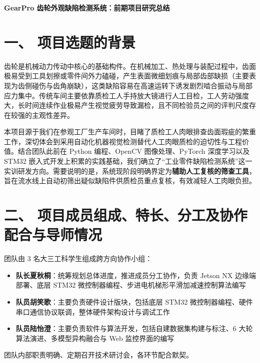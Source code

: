 
\begin{center}
{\bfseries GearPro 齿轮外观缺陷检测系统：前期项目研究总结\par}
\end{center}

\section*{一、 项目选题的背景}

齿轮是机械动力传动中核心的基础构件。在机械加工、热处理与装配过程中，齿面极易受到工具划擦或零件间外力磕碰，产生表面微细划痕与局部齿部缺损（主要表现为齿侧碰伤与齿角崩缺），这类缺陷容易在高速运转下诱发剧烈啮合振动与局部应力集中。传统车间主要依靠质检工人手持放大镜进行人工目检，工人劳动强度大，长时间连续作业极易产生视觉疲劳导致漏检，且不同检验员之间的评判尺度存在较强的主观性差异。

本项目源于我们在参观工厂生产车间时，目睹了质检工人肉眼排查齿面瑕疵的繁重工作，深切体会到采用自动化机器视觉检测替代人工肉眼质检的迫切性与工程价值。结合团队此前在 Python 编程、OpenCV 图像处理、PyTorch 深度学习以及 STM32 嵌入式开发上积累的实践基础，我们确立了“工业零件缺陷检测系统”这一实训研发方向。需要说明的是，系统现阶段明确界定为\textbf{辅助人工复核的筛查工具}，旨在流水线上自动初筛出疑似缺陷件供质检员重点复核，有效减轻人工肉眼负担。

\section*{二、 项目成员组成、特长、分工及协作配合与导师情况}

团队由 3 名大三工科学生组成跨方向协作小组：
\begin{itemize}
    \item \textbf{队长夏秋桐}：统筹规划总体进度，推进成员分工协作，负责 Jetson NX 边缘端部署、底层 STM32 微控制器编程、步进电机梯形平滑加减速控制算法编写
    \item \textbf{队员胡笑歌}：主要负责硬件设计版块，包括底层 STM32 微控制器编程、硬件串口通信协议联调，整体硬件架构设计与调试工作
    \item \textbf{队员陆怡澄}：主要负责软件与算法开发，包括自建数据集构建与标注、6 大轮算法演进、多模型异构融合与 Web 监控界面的编写
\end{itemize}

团队内部职责明确、定期召开技术研讨会，各环节配合默契。

